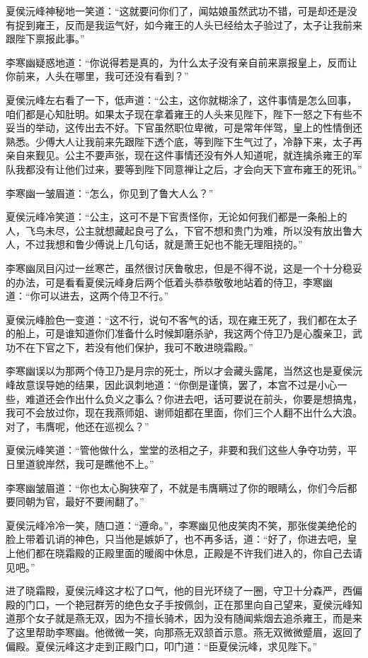 夏侯沅峰神秘地一笑道：“这就要问你们了，闻姑娘虽然武功不错，可是却还是没有捉到雍王，反而是我运气好，如今雍王的人头已经给太子验过了，太子让我前来跟陛下禀报此事。”

李寒幽疑惑地道：“你说得若是真的，为什么太子没有亲自前来禀报皇上，反而让你前来，人头在哪里，我可还没有看到？”

夏侯沅峰左右看了一下，低声道：“公主，这你就糊涂了，这件事情是怎么回事，咱们都是心知肚明。如果太子现在拿着雍王的人头来见陛下，陛下一怒之下有些不妥当的举动，这传出去不好。下官虽然职位卑微，可是常年伴驾，皇上的性情倒还熟悉。少傅大人让我前来先跟陛下透个底，等到陛下生气过了，冷静下来，太子再亲自来觐见。公主不要声张，现在这件事情还没有外人知道呢，就连擒杀雍王的军队我都没有让他们过来，要等到陛下同意禅让之后，才会向天下宣布雍王的死讯。”

李寒幽一皱眉道：“怎么，你见到了鲁大人么？”

夏侯沅峰冷笑道：“公主，这可不是下官责怪你，无论如何我们都是一条船上的人，飞鸟未尽，公主就想藏起良弓了么，下官不想和贵门为难，所以没有放出鲁大人，不过我想和鲁少傅说上几句话，就是萧王妃也不能无理阻挠的。”

李寒幽凤目闪过一丝寒芒，虽然很讨厌鲁敬忠，但是不得不说，这是一个十分稳妥的办法，可是看看夏侯沅峰身后两个低着头恭恭敬敬地站着的侍卫，李寒幽道：“你可以进去，这两个侍卫不行。”

夏侯沅峰脸色一变道：“这不行，说句不客气的话，现在雍王死了，我们都在太子的船上，可是谁知道你们准备什么时候卸磨杀驴，我这两个侍卫乃是心腹亲卫，武功不在下官之下，若没有他们保护，我可不敢进晓霜殿。”

李寒幽误以为那两个侍卫乃是月宗的死士，所以才会藏头露尾，当然这也是夏侯沅峰故意误导她的结果，因此讽刺地道：“你倒是谨慎，罢了，本宫不过是小心一些，难道还会作出什么负义之事么？你进去吧，话可要说在前头，你要是想搞鬼，我可不会放过你，现在我燕师姐、谢师姐都在里面，你们三个人翻不出什么大浪。对了，韦膺呢，他还在巡视么？”

夏侯沅峰笑道：“管他做什么，堂堂的丞相之子，非要和我们这些人争夺功劳，平日里道貌岸然，我可是瞧他不上。”

李寒幽皱眉道：“你也太心胸狭窄了，不就是韦膺瞒过了你的眼睛么，你们今后都要同朝为官，最好不要闹翻了。”

夏侯沅峰冷冷一笑，随口道：“遵命。”，李寒幽见他皮笑肉不笑，那张俊美绝伦的脸上带着讥诮的神色，只当他是嫉妒了，也不再多话，道：“好了，你进去吧，皇上他们都在晓霜殿的正殿里面的暖阁中休息，正殿是不许我们进入的，你自己去请见吧。”

进了晓霜殿，夏侯沅峰这才松了口气，他的目光环绕了一圈，守卫十分森严，西偏殿的门口，一个艳冠群芳的绝色女子手按佩剑，正在那里向自己望来，夏侯沅峰知道那个女子就是燕无双，因为不擅长骑术，因为没有随闻紫烟去追杀雍王，而是来了这里帮助李寒幽。他微微一笑，向那燕无双颔首示意。燕无双微微蹙眉，返回了偏殿。夏侯沅峰这才走到正殿门口，叩门道：“臣夏侯沅峰，求见陛下。”

